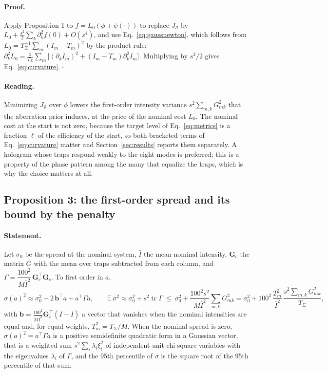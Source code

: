 \paragraph{Proof.} Apply Proposition 1 to $f=L_0(\phi+\psi(\cdot))$ to replace $J_{\mathcal S}$ by $L_0+\frac{s^2}2\sum_k\partial_k^2f(0)+O(s^4)$, and use Eq.~\eqref{eq:gaussnewton}, which follows from $L_0=T_\Sigma^{-1}\sum_m(I_m-T_m)^2$ by the product rule: $\partial_k^2L_0=\frac2{T_\Sigma}\sum_m\big[(\partial_kI_m)^2+(I_m-T_m)\partial_k^2I_m\big]$. Multiplying by $s^2/2$ gives Eq.~\eqref{eq:curvature}. \hfill$\square$

\paragraph{Reading.} Minimizing $J_{\mathcal S}$ over $\phi$ lowers the first-order intensity variance $s^2\sum_{m,k}G_{mk}^2$ that the aberration prior induces, at the price of the nominal cost $L_0$. The nominal cost at the start is not zero, because the target level of Eq.~\eqref{eq:metrics} is a fraction $\ell$ of the efficiency of the start, so both bracketed terms of Eq.~\eqref{eq:curvature} matter and Section~\ref{sec:results} reports them separately. A hologram whose traps
respond weakly to the eight modes is preferred; this is a property of the phase pattern among the many that equalize the traps, which is why the choice matters at all.

\subsection{Proposition 3: the first-order spread and its bound by the penalty}

\paragraph{Statement.} Let $\sigma_0$ be the spread at the nominal system, $\bar I$ the mean nominal intensity, $\mathbf G_c$ the matrix $G$ with the mean over traps subtracted from each column, and $\Gamma=\dfrac{100^2}{M\bar I^2}\,\mathbf G_c^{\top}\mathbf G_c$. To first order in $a$,
\begin{equation}
\sigma(a)^2\approx\sigma_0^2+2\,\mathbf b^{\top}a+a^{\top}\Gamma a,\qquad \mathbb E\,\sigma^2\approx\sigma_0^2+s^2\operatorname{tr}\Gamma\ \le\ \sigma_0^2+\frac{100^2s^2}{M\bar I^2}\sum_{m,k}G_{mk}^2=\sigma_0^2+100^2\,\frac{T_m^2}{\bar I^2}\,\frac{s^2\sum_{m,k}G_{mk}^2}{T_\Sigma},\label{eq:spreadbound}
\end{equation}
with $\mathbf b=\frac{100^2}{M\bar I^2}\mathbf G_c^{\top}(I-\bar I)$ a vector that vanishes when the nominal intensities are equal and, for equal weights, $T_m^2=T_\Sigma/M$. When the nominal spread is zero, $\sigma(a)^2=a^{\top}\Gamma a$ is a positive semidefinite quadratic form in a Gaussian vector, that is a weighted sum $s^2\sum_i\lambda_i\xi_i^2$ of independent unit chi-square variables with the eigenvalues $\lambda_i$ of $\Gamma$, and the 95th percentile of $\sigma$
is the square root of the 95th percentile of that sum.

